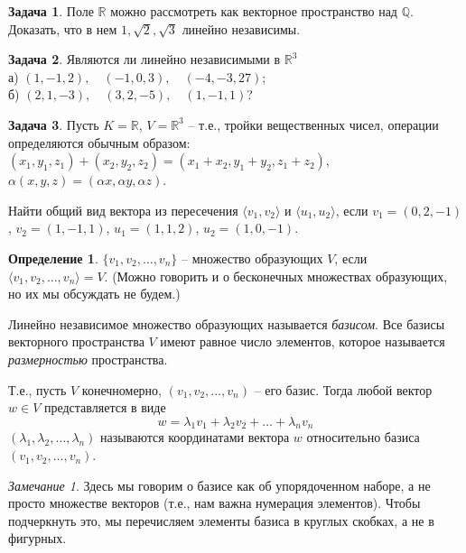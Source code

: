 \documentclass[12pt, fleqn]{extarticle}
\newcommand{\rational}{\mathbb{Q}}
\newcommand{\real}{\mathbb{R}}
\theoremstyle{definition}
\newtheorem{definition}{Определение}
\newtheorem{problem}{Задача}
\theoremstyle{remark}
\newtheorem*{remark}{Замечание}
\begin{document}
\begin{problem}
Поле $\real$ можно рассмотреть как векторное пространство над $\rational$.
Доказать, что в нем $1, \sqrt{2}, \sqrt{3}$ линейно независимы.
\end{problem}

\begin{problem}
Являются ли линейно независимыми в $\real^{3}$\\
а) $(1, -1, 2), \quad(-1, 0, 3), \quad(-4, -3, 27)$;\\
б) $(2, 1, -3), \quad(3, 2, -5), \quad(1, -1, 1)$?
\end{problem}

\begin{problem}
Пусть $K = \real$, $V = \real^{3}$ -- т.е., тройки вещественных чисел, операции определяются обычным образом:\\
$(x_1, y_1, z_1) + (x_2, y_2, z_2) = (x_1 + x_2, y_1 + y_2, z_1 + z_2)$,\\
$\alpha(x, y, z) = (\alpha x, \alpha y, \alpha z)$.
 
Найти общий вид вектора из пересечения
$\langle v_{1}, v_{2}\rangle$ и $\langle u_{1}, u_{2}\rangle$,
если $v_{1} = (0, 2, -1)$, $v_{2} = (1, -1, 1)$, 
$u_{1} = (1, 1, 2)$, $u_{2} = (1, 0, -1)$.
\end{problem}

\begin{definition}
$\{v_{1}, v_{2}, \ldots, v_{n}\}$ -- множество образующих $V$,
если $\langle v_{1}, v_{2}, \ldots, v_{n} \rangle = V$.
(Можно говорить и о бесконечных множествах образующих, но их мы обсуждать не будем.)

Линейно независимое множество образующих называется {\it базисом}.
Все базисы векторного пространства $V$ имеют равное число элементов, которое называется {\it размерностью} пространства.

Т.е., пусть $V$ конечномерно, $(v_{1}, v_{2}, \ldots, v_{n})$ -- его базис.
Тогда любой вектор $w \in V$ представляется в  виде 
$$w = \lambda_{1}v_{1} + \lambda_{2}v_{2} + \ldots + \lambda_{n}v_{n}$$
$(\lambda_{1}, \lambda_{2}, \ldots, \lambda_{n})$ называются координатами вектора $w$
относительно базиса $(v_{1}, v_{2}, \ldots, v_{n})$.
\end{definition}

\begin{remark}
Здесь мы говорим о базисе как об упорядоченном наборе, а не просто множестве векторов
(т.е., нам важна нумерация элементов). Чтобы подчеркнуть это, мы 
перечисляем элементы базиса в круглых скобках, а не в фигурных.
\end{remark}
\end{document}
